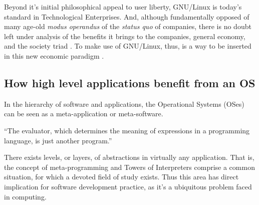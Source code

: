 \documentclass[
12pt,				%
openright,			%
oneside,			%
a4paper,			%
brazil,				%
english,			%
]{abntex2}
\begin{document}
Beyond it's initial philosophical appeal to user liberty, GNU/Linux is
today's standard in Technological Enterprises. And, although
fundamentally opposed of many age-old \textit{modus operandus} of the
\textit{status quo} of companies, there is no doubt left under
analysis of the benefits it brings to the companies, general economy, and
the society triad \cite{moody2009rebel}. To make use of GNU/Linux,
thus, is a way to be inserted in this new economic paradigm \cite{hippel2003open,peters2009open}.

\subsection{How high level applications benefit from an OS}

In the hierarchy of software and applications, the Operational Systems (OSes) can be seen as a meta-application or meta-software. 

``The evaluator, which determines the meaning of expressions in a
programming language, is just another program.'' \cite{abelson1996structure}

There exists levels, or layers, of abstractions in virtually any
application. That is, the concept of meta-programming and Towers of
Interpreters comprise a common situation, for which a devoted field of
study exists. Thus this area has direct implication for software
development practice, as it's a ubiquitous problem faced in computing.
\end{document}
